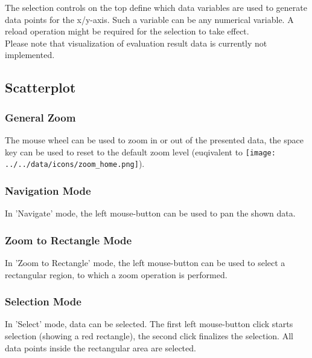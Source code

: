 The selection controls on the top define which data variables are used to generate data points for the x/y-axis. Such a variable can be any numerical variable. A reload operation might be required for the selection to take effect. \\

Please note that visualization of evaluation result data is currently not implemented.

\subsection{Scatterplot}

\subsubsection{General Zoom}

The mouse wheel can be used to zoom in or out of the presented data, the space key can be used to reset to the default zoom level (euqivalent to \texttt{[image: ../../data/icons/zoom\_home.png]}).

\subsubsection{Navigation Mode}

In 'Navigate' mode, the left mouse-button can be used to pan the shown data.

\subsubsection{Zoom to Rectangle Mode}

In 'Zoom to Rectangle' mode, the left mouse-button can be used to select a rectangular region, to which a zoom operation is performed.

\subsubsection{Selection Mode}

In 'Select' mode, data can be selected. The first left mouse-button click starts selection (showing a red rectangle), the second click finalizes the selection. All data points inside the rectangular area are selected.

